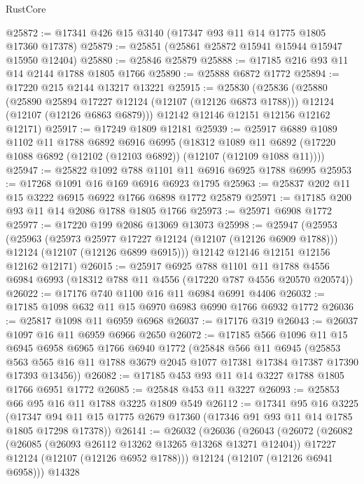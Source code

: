 \begin{lexlean}{RustCore}
\begin{coremodule}
@25872 := @17341 @426 @15 @3140 (@17347 @93 @11 @14 @1775 @1805 @17360 @17378)
@25879 := @25851 (@25861 @25872 @15941 @15944 @15947 @15950 @12404)
@25880 := @25846 @25879
@25888 := @17185 @216 @93 @11 @14 @2144 @1788 @1805 @1766
@25890 := @25888 @6872 @1772
@25894 := @17220 @215 @2144 @13217 @13221
@25915 := @25830
    (@25836
      (@25880
        (@25890 @25894 @17227 @12124 (@12107 (@12126 @6873 @1788)))
        @12124
        (@12107 (@12126 @6863 @6879)))
      @12142
      @12146
      @12151
      @12156
      @12162
      @12171)
@25917 := @17249 @1809 @12181
@25939 := @25917
    @6889
    @1089
    @1102
    @11
    @1788
    @6892
    @6916
    @6995
    (@18312
      @1089
      @11
      @6892
      (@17220 @1088 @6892 (@12102 (@12103 @6892)) (@12107 (@12109 @1088 @11))))
@25947 := @25822 @1092 @788 @1101 @11 @6916 @6925 @1788 @6995
@25953 := @17268 @1091 @16 @169 @6916 @6923 @1795
@25963 := @25837 @202 @11 @15 @3222 @6915 @6922 @1766 @6898 @1772 @25879
@25971 := @17185 @200 @93 @11 @14 @2086 @1788 @1805 @1766
@25973 := @25971 @6908 @1772
@25977 := @17220 @199 @2086 @13069 @13073
@25998 := @25947
    (@25953
      (@25963
        (@25973 @25977 @17227 @12124 (@12107 (@12126 @6909 @1788)))
        @12124
        (@12107 (@12126 @6899 @6915)))
      @12142
      @12146
      @12151
      @12156
      @12162
      @12171)
@26015 := @25917
    @6925
    @788
    @1101
    @11
    @1788
    @4556
    @6984
    @6993
    (@18312 @788 @11 @4556 (@17220 @787 @4556 @20570 @20574))
@26022 := @17176 @740 @1100 @16 @11 @6984 @6991 @4406
@26032 := @17185 @1098 @632 @11 @15 @6970 @6983 @6990 @1766 @6932 @1772
@26036 := @25817 @1098 @11 @6959 @6968
@26037 := @17176 @319
@26043 := @26037 @1097 @16 @11 @6959 @6966 @2650
@26072 := @17185
    @566
    @1096
    @11
    @15
    @6945
    @6958
    @6965
    @1766
    @6940
    @1772
    (@25848
      @566
      @11
      @6945
      (@25853 @563 @565 @16 @11 @1788 @3679 @2045 @1077 @17381 @17384 @17387 @17390 @17393 @13456))
@26082 := @17185 @453 @93 @11 @14 @3227 @1788 @1805 @1766 @6951 @1772
@26085 := @25848 @453 @11 @3227
@26093 := @25853 @66 @95 @16 @11 @1788 @3225 @1809 @549
@26112 := @17341
    @95
    @16
    @3225
    (@17347 @94 @11 @15 @1775 @2679 @17360 (@17346 @91 @93 @11 @14 @1785 @1805 @17298 @17378))
@26141 := @26032
    (@26036
      (@26043
        (@26072
          (@26082
            (@26085 (@26093 @26112 @13262 @13265 @13268 @13271 @12404))
            @17227
            @12124
            (@12107 (@12126 @6952 @1788)))
          @12124
          (@12107 (@12126 @6941 @6958)))
        @14328

\end{coremodule}
\end{lexlean}
